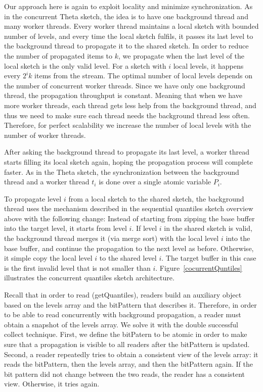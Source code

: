 Our approach here is again to exploit locality and minimize
synchronization.
As in the concurrent Theta sketch, the idea is to have one
background thread and many worker threads.
Every worker thread maintains a local sketch with bounded number
of levels, and every time the local sketch fulfils, it passes
its last level to the background thread to propagate it to the
shared sketch.
In order to reduce the number of propagated items to $k$, we
propagate when the last level of the local sketch is the only
valid level.
For a sketch with $i$ local levels, it happens every $2^ik$
items from the stream.
The optimal number of local levels depends on the number of
concurrent worker threads.
Since we have only one background thread, the propagation
throughput is constant.
Meaning that when we have more worker threads, each thread gets
less help from the background thread, and thus
we need to make sure each thread needs the background thread
less often.
Therefore, for perfect scalability we increase the number of
local levels with the number of worker threads.

After asking the background thread to propagate its last level,
a worker thread starts filling its local sketch again, hoping the
propagation process will complete faster.
As in the Theta sketch, the synchronization between the
background thread and a worker thread $t_i$ is done over a
single atomic variable $P_i$.

To propagate level $i$ from a local sketch to the shared sketch,
the background thread uses the mechanism described in the
sequential quantiles sketch overview above with the following
change:
Instead of starting from zipping the base buffer
into the target level, it starts from level $i$.
If level $i$ in the shared sketch is valid, the background
thread merges it (via merge sort) with the local level $i$ into
the base buffer, and continue the propagation to the next level
as before.
Otherwise, it simple copy the local level $i$ to the shared level
$i$.
The target buffer in this case is the first invalid level that is
not smaller than $i$.
Figure~\ref{cocurrentQuntiles} illustrates the concurrent
quantiles sketch architecture.

Recall that in order to read (getQuantiles), readers build an
auxiliary object based on the levels array and the bitPattern
that describes it.
Therefore, in order to be able to read concurrently with
background propagation, a reader must obtain a snapshot of the
levels array.
We solve it with the double successful collect technique.
First, we define the bitPatern to be atomic in order to make sure
that a propagation is visible to all readers after the
bitPattern is updated.
Second, a reader repeatedly tries to obtain a consistent view of
the levels array: it reads the bitPattern, then the levels array,
and then the bitPattern again.
If the bit pattern did not change between the two reads, the
reader has a consistent view.
Otherwise, it tries again.

